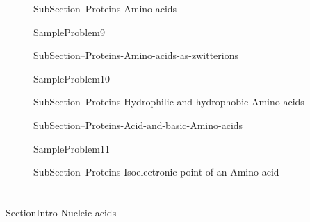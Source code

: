 \documentclass[main.tex]{subfiles}
\begin{document}
\sloppy\begin{description}


\item[] {SubSection--Proteins-Amino-acids}





  {SampleProblem9}


\item[] {SubSection--Proteins-Amino-acids-as-zwitterions}





  {SampleProblem10}



\item[] {SubSection--Proteins-Hydrophilic-and-hydrophobic-Amino-acids}








\item[] {SubSection--Proteins-Acid-and-basic-Amino-acids}



  {SampleProblem11}


\item[] 
{SubSection--Proteins-Isoelectronic-point-of-an-Amino-acid}



\end{description}


\section{\color{blue!30!black}{Nucleic acids}}{SectionIntro-Nucleic-acids}
\end{document}
